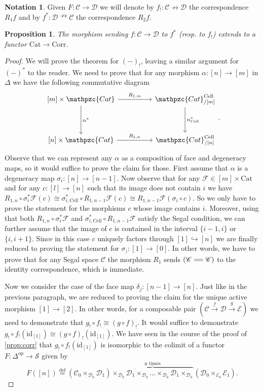 \documentclass[a4paper, reqno]{amsart}
\newtheorem{prop}[theorem]{Proposition}
\theoremstyle{definition}
\newtheorem{notation}[theorem]{Notation}
\newcommand\cC{\mathscr C}
\newcommand\cD{\mathscr D}
\newcommand\cE{\mathscr E}
\newcommand\cF{\mathscr F}
\newcommand\cS{\mathscr S}
\newcommand\id{\mathrm{id}}
\newcommand\op{\mathrm{op}}
\newcommand\cat{\mathrm{Cat}}
\newcommand\ccat{\mathpzc{Cat}}
\newcommand\bydef{\overset{\mathrm{def}}{=}}
\newcommand\corr{\mathrm{Corr}}
\newcommand\cell{\mathrm{Cell}}
\begin{document}
\begin{notation}\label{not_cat}
Given $F:\cC\rightarrow\cD$ we will denote by $f_!:\cC\nrightarrow\cD$ the correspondence $R_1 f$ and by $f^*:\cD\nrightarrow\cC$ the correspondence $R_2f$.
\end{notation}
\begin{prop}\label{prop:fun_comp}
The morphism sending $f:\cC\rightarrow\cD$ to $f^*$ (resp. to $f_!$) extends to a functor $\cat\rightarrow \corr$.
\end{prop}
\begin{proof}
We will prove the theorem for $(-)_!$, leaving a similar argument for $(-)^*$ to the reader. We need to prove that for any morphism $\alpha:[n]\rightarrow[m]$ in $\Delta$ we have the following commutative diagram
\[
\begin{tikzcd}[row sep=huge, column sep=huge]
{[m]}\times \ccat\arrow[r, "R_{1,m}"]\arrow[d, "\alpha^*"]&\ccat^\cell_{/[m]}\arrow[d, "\alpha^*_\cell"]\\
{[n]}\times\ccat\arrow[r, "R_{1,n}"]&\ccat^\cell_{/[n]}
\end{tikzcd}.
\]
Observe that we can represent any $\alpha$ as a composition of face and degeneracy maps, so it would suffice to prove the claim for those. First assume that $\alpha$ is a degeneracy map $\sigma_i:[n]\rightarrow[n-1]$. Now observe that for any $\cF\in[m]\times\cat$ and for any $c:[l]\rightarrow[n]$ such that its image does not contain $i$ we have $R_{1,n}\circ \sigma_i^*\cF(c)\cong \sigma^*_{i,\cell}\circ R_{1,n-1}\cF(c)\cong R_{1,n-1}\cF(\sigma_i\circ{c})$. So we only have to prove the statement for the morphisms $c$ whose image contains $i$. Moreover, using that both $R_{1,n}\circ \sigma_i^*\cF$ and $\sigma^*_{i,\cell}\circ R_{1,n-1}\cF$ satisfy the Segal condition, we can further assume that the image of $c$ is contained in the interval $\{i-1,i\}$ or $\{i,i+1\}$. Since in this case $c$ uniquely factors through $[1]\hookrightarrow[n]$ we are finally reduced to proving the statement for $\sigma_):[1]\rightarrow[0]$. In other words, we have to prove that for any Segal space $\cC$ the morphism $R_1$ sends $(\cC=\joinrel=\cC)$ to the identity correspondence, which is immediate.\par
Now we consider the case of the face map $\delta_j:[n-1]\rightarrow[n]$. Just like in the previous paragraph, we are reduced to proving the claim for the unique active morphism $[1]\rightarrow[2]$. In other words, for a composable pair $(\cC\xrightarrow{f}\cD\xrightarrow{g}\cE)$ we need to demonstrate that $g_!\circ f_!\cong (g\circ f)_!$. It would suffice to demonstrate $g_!\circ f_!(\id_{[1]})\cong (g\circ f)_!(\id_{[1]})$. We have seen in the course of the proof of \cref{prop:corr} that $g_!\circ f_!(\id_{[1]})$ is isomorphic to the colimit of a functor $F:\Delta^\op\rightarrow\cS$ given by \[F([n])\bydef(\cC_0\times_{\cD_0}\cD_1)\overbrace{\times_{\cD_0}\cD_1\times_{\cD_0}...\times_{\cD_0}\cD_1\times_{\cD_0}}^\text{n times}(\cD_0\times_{\cE_0}\cE_1).\] 

\end{proof}
\end{document}

